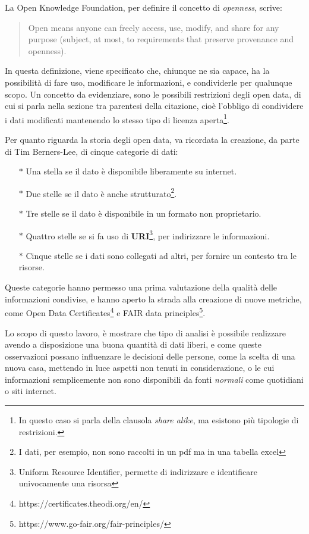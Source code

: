 \documentclass[a4paper,12pt]{report}
\newcommand{\quotestyle}[1]{\textit{#1}}
\newcommand{\skipline}{\vspace{0.2in}}
\begin{document}
La Open Knowledge Foundation, per definire il concetto di \quotestyle{openness}, 
scrive: 

\begin{quotation}
    Open means anyone can freely access, use, modify, and share for any purpose 
    (subject, at most, to requirements that preserve provenance and openness). \cite{OPENDEFINITION:1}
\end{quotation}

In questa definizione, viene specificato che, chiunque ne sia capace, ha la possibilità di 
fare uso, modificare le informazioni, e condividerle per qualunque scopo. 
Un concetto da evidenziare, sono le possibili restrizioni degli open data, 
di cui si parla nella sezione tra parentesi della citazione, 
cioè l'obbligo di condividere i dati modificati 
mantenendo lo stesso tipo di licenza 
aperta\footnote{In questo caso si parla della clausola \quotestyle{share alike}, ma 
esistono più tipologie di restrizioni.}. 

Per quanto riguarda la storia degli open data, va ricordata la creazione, da parte di 
Tim Berners-Lee, di cinque categorie di dati: 

\begin{itemize}
    \item[$\ast$] Una stella se il dato è disponibile liberamente su internet.
    \item[$\ast$] Due stelle se il dato è anche strutturato\footnote{I dati, 
    per esempio, non sono raccolti in un pdf ma in una tabella excel}.
    \item[$\ast$] Tre stelle se il dato è disponibile in un formato non proprietario.
    \item[$\ast$] Quattro stelle se si fa uso 
    di \textbf{URI}\footnote{Uniform Resource Identifier, permette di indirizzare e 
    identificare univocamente una risorsa}, per indirizzare le informazioni.
    \item[$\ast$] Cinque stelle se i dati sono collegati ad altri, 
    per fornire un contesto tra le risorse.
\end{itemize}

Queste categorie hanno permesso una prima valutazione della qualità delle informazioni condivise, 
e hanno aperto la strada alla creazione di nuove metriche, come 
Open Data Certificates\footnote{https://certificates.theodi.org/en/} e FAIR data 
principles\footnote{https://www.go-fair.org/fair-principles/}.

\skipline
Lo scopo di questo lavoro, è mostrare che tipo di analisi è possibile realizzare 
avendo a disposizione una buona quantità di dati liberi, e come queste osservazioni possano 
influenzare le decisioni delle persone, come la scelta di una nuova casa, 
mettendo in luce aspetti non tenuti in considerazione, o le cui informazioni semplicemente 
non sono disponibili da fonti \quotestyle{normali} come quotidiani o siti internet.
\end{document}
